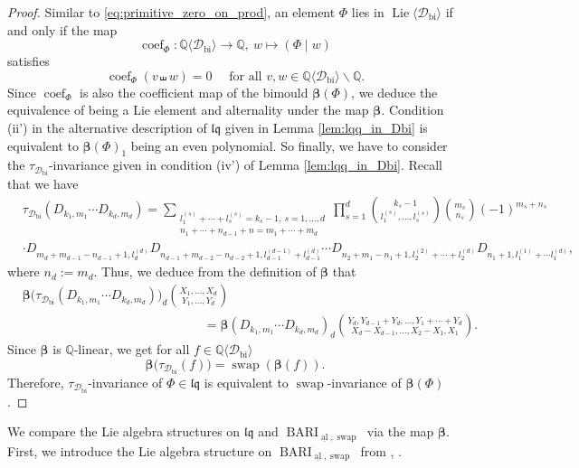 \documentclass[12pt,reqno]{amsart}
\numberwithin{equation}{section}
\theoremstyle{definition}
\newcommand{\QQ}{\mathbb{Q}}
\newcommand{\BARI}{\operatorname{BARI}_{\underline{\operatorname{al}},\operatorname{swap}}}
\newcommand{\bimap}{\boldsymbol{\beta}}
\newcommand{\Dbi}{\mathcal{D}_{\operatorname{bi}}}
\newcommand{\QDbi}{\QQ\langle \Dbi\rangle}
\newcommand{\LieDbi}{\operatorname{Lie}\langle \Dbi\rangle}
\newcommand{\lqq}{\mathfrak{lq}}
\begin{document}
\begin{proof} Similar to \eqref{eq:primitive_zero_on_prod}, an element $\Phi$ lies in $\LieDbi$ if and only if the map \[\operatorname{coef}_\Phi:\QDbi\to\QQ,\ w\mapsto (\Phi\mid w)\] 
satisfies 
\[\operatorname{coef}_\Phi(v\shuffle w)=0\quad  \text{ for all } v,w \in \QDbi\backslash\QQ.\]  
Since $\operatorname{coef}_\Phi$ is also the coefficient map of the bimould $\bimap(\Phi)$, we deduce the equivalence of being a Lie element and alternality under the map $\bimap$.
Condition (ii') in the alternative description of $\lqq$ given in Lemma \ref{lem:lqq_in_Dbi} is equivalent to $\bimap(\Phi)_1$ being an even polynomial. 
So finally, we have to consider the $\tau_{\Dbi}$-invariance given in condition (iv') of Lemma \ref{lem:lqq_in_Dbi}. Recall that we have
\begin{align*}
&\tau_{\Dbi}(D_{k_1,m_1}\cdots D_{k_d,m_d})=\sum_{\substack{l_1^{(s)}+\cdots+l_s^{(s)}=k_s-1,\ s=1,\ldots,d \\ n_1+\cdots+n_{d-1}+n=m_1+\cdots+m_d}} \prod_{s=1}^d \binom{k_s-1}{l_1^{(s)},\ldots,l_s^{(s)}} \binom{m_s}{n_s}(-1)^{m_s+n_s} \\
&\cdot D_{m_d+m_{d-1}-n_{d-1}+1,l_d^{(d)}}D_{n_{d-1}+m_{d-2}-n_{d-2}+1,l_{d-1}^{(d-1)}+l_{d-1}^{(d)}}\cdots D_{n_2+m_1-n_1+1,l_2^{(2)}+\cdots+l_2^{(d)}}D_{n_1+1,l_1^{(1)}+\cdots l_1^{(d)}},
\end{align*}
where $n_d:=m_d$. Thus, we deduce from the definition of $\bimap$ that
\begin{align*}
&\bimap\big(\tau_{\Dbi}(D_{k_1,m_1}\cdots D_{k_d,m_d})\big)_d\binom{X_1,\ldots,X_d}{Y_1,\ldots,Y_d}\\
&\hspace{6cm}=\bimap(D_{k_1,m_1}\cdots D_{k_d,m_d})_d\binom{Y_d,Y_{d-1}+Y_d,\ldots,Y_1+\cdots+Y_d}{X_d-X_{d-1},\ldots,X_2-X_1,X_1}.
\end{align*}
Since $\bimap$ is $\QQ$-linear, we get for all $f\in\QDbi$
\[\bimap\big(\tau_{\Dbi}(f)\big)=\operatorname{swap}(\bimap(f)).\]
Therefore, $\tau_{\Dbi}$-invariance of $\Phi\in\lqq$ is equivalent to $\operatorname{swap}$-invariance of $\bimap(\Phi)$.
\end{proof}

We compare the Lie algebra structures on $\lqq$ and $\BARI$ via the map $\bimap$. First, we introduce the Lie algebra structure on $\BARI$ from \cite{Ec11}, \cite{Sc15}.
\end{document}

